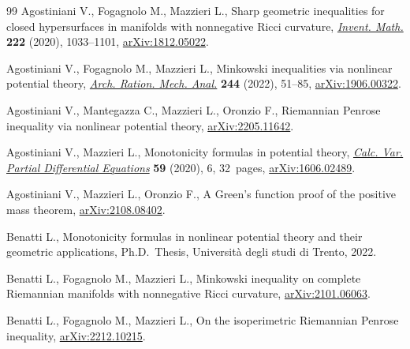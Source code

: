 \documentclass[11pt]{article}
\numberwithin{equation}{section}
\numberwithin{equation}{section}
\begin{document}
\begin{thebibliography}{99}
Agostiniani V., Fogagnolo M., Mazzieri L., Sharp geometric inequalities for
 closed hypersurfaces in manifolds with nonnegative {R}icci curvature,
 \href{https://doi.org/10.1007/s00222-020-00985-4}{\textit{Invent. Math.}} \textbf{222} (2020), 1033--1101, \href{https://arxiv.org/abs/1812.05022}{arXiv:1812.05022}.

Agostiniani V., Fogagnolo M., Mazzieri L., Minkowski inequalities via nonlinear
 potential theory, \href{https://doi.org/10.1007/s00205-022-01756-6}{\textit{Arch. Ration. Mech. Anal.}} \textbf{244} (2022),
 51--85, \href{https://arxiv.org/abs/1906.00322}{arXiv:1906.00322}.

Agostiniani V., Mantegazza C., Mazzieri L., Oronzio F., Riemannian {P}enrose
 inequality via nonlinear potential theory, \href{https://arxiv.org/abs/2205.11642}{arXiv:2205.11642}.

Agostiniani V., Mazzieri L., Monotonicity formulas in potential theory,
 \href{https://doi.org/10.1007/s00526-019-1665-2}{\textit{Calc. Var. Partial Differential Equations}} \textbf{59} (2020), 6,
 32~pages, \href{https://arxiv.org/abs/1606.02489}{arXiv:1606.02489}.

Agostiniani V., Mazzieri L., Oronzio F., A {G}reen's function proof of the
 positive mass theorem, \href{https://arxiv.org/abs/2108.08402}{arXiv:2108.08402}.

Benatti L., Monotonicity formulas in nonlinear potential theory and their
 geometric applications, Ph.D.~Thesis, {U}niversit\`a degli studi di Trento,
 2022.

Benatti L., Fogagnolo M., Mazzieri L., Minkowski inequality on complete
 {R}iemannian manifolds with nonnegative {R}icci curvature,
 \href{https://arxiv.org/abs/2101.06063}{arXiv:2101.06063}.

Benatti L., Fogagnolo M., Mazzieri L., On the isoperimetric {R}iemannian
 {P}enrose inequality, \href{https://arxiv.org/abs/2212.10215}{arXiv:2212.10215}.


\end{thebibliography}
\end{document}
